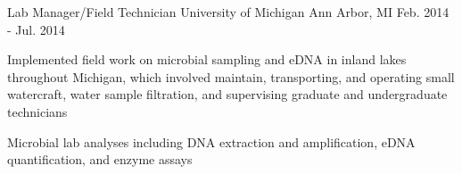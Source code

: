 \begin{cventries}
  \cventry
    {Lab Manager/Field Technician} %
    {University of Michigan} %
    {Ann Arbor, MI} %
    {Feb. 2014 - Jul. 2014} %
    {
      \begin{cvitems} %
        \item {Implemented field work on microbial sampling and eDNA in inland lakes throughout Michigan, which involved maintain, transporting, and operating small watercraft, water sample filtration, and supervising graduate and undergraduate technicians}
        \item {Microbial lab analyses including DNA extraction and amplification, eDNA quantification, and enzyme assays}
      \end{cvitems}
    }


\end{cventries}

